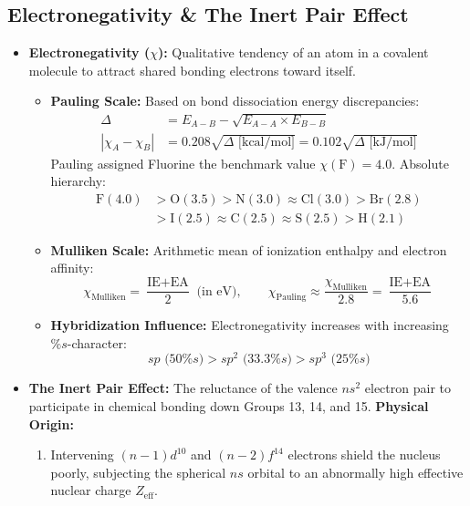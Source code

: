 \documentclass[10pt,twoside,openright]{book}
\begin{document}
\subsection{Electronegativity \& The Inert Pair Effect}
\begin{itemize}
  \item \textbf{Electronegativity ($\chi$):} Qualitative tendency of an atom in a covalent molecule to attract shared bonding electrons toward itself.
  \begin{itemize}
    \item \textbf{Pauling Scale:} Based on bond dissociation energy discrepancies:
    \begin{align}
      \Delta &= E_{A-B} - \sqrt{E_{A-A} \times E_{B-B}} \\
      |\chi_A - \chi_B| &= 0.208\sqrt{\Delta\text{ [kcal/mol]}} = 0.102\sqrt{\Delta\text{ [kJ/mol]}}
    \end{align}
    Pauling assigned Fluorine the benchmark value $\chi(\mathrm{F}) = 4.0$. Absolute hierarchy:
    \begin{align}
      \mathrm{F (4.0)} &> \mathrm{O (3.5)} > \mathrm{N (3.0)} \approx \mathrm{Cl (3.0)} > \mathrm{Br (2.8)} \\
      &> \mathrm{I (2.5)} \approx \mathrm{C (2.5)} \approx \mathrm{S (2.5)} > \mathrm{H (2.1)}
    \end{align}
    \item \textbf{Mulliken Scale:} Arithmetic mean of ionization enthalpy and electron affinity:
    \begin{equation}
      \chi_{\text{Mulliken}} = \frac{\text{IE} + \text{EA}}{2}\text{ (in eV)}, \qquad \chi_{\text{Pauling}} \approx \frac{\chi_{\text{Mulliken}}}{2.8} = \frac{\text{IE} + \text{EA}}{5.6}
    \end{equation}
    \item \textbf{Hybridization Influence:} Electronegativity increases with increasing $\% s$-character:
    \begin{equation}
      sp\text{ (50\% } s\text{)} > sp^2\text{ (33.3\% } s\text{)} > sp^3\text{ (25\% } s\text{)}
    \end{equation}
  \end{itemize}
  \item \textbf{The Inert Pair Effect:}
  The reluctance of the valence $ns^2$ electron pair to participate in chemical bonding down Groups 13, 14, and 15.
  \textbf{Physical Origin:}
  \begin{enumerate}
    \item Intervening $(n-1)d^{10}$ and $(n-2)f^{14}$ electrons shield the nucleus poorly, subjecting the spherical $ns$ orbital to an abnormally high effective nuclear charge $Z_{\text{eff}}$.

\end{enumerate}
\end{itemize}
\end{document}

